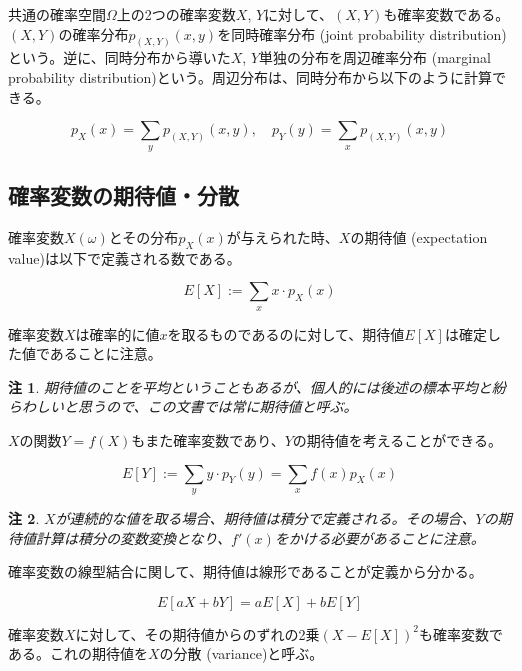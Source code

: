 \documentclass[uplatex,dvipdfmx]{jlreq}
\newcommand\term[1]{\textsf{#1}}
\newtheorem{note}{注}
\begin{document}
共通の確率空間$\Omega$上の2つの確率変数$X$, $Y$に対して、$(X, Y)$も確率変数である。$(X, Y)$の確率分布$p_{(X, Y)}(x, y)$を\term{同時確率分布 (joint probability distribution)}という。逆に、同時分布から導いた$X$, $Y$単独の分布を\term{周辺確率分布 (marginal probability distribution)}という。周辺分布は、同時分布から以下のように計算できる。

\begin{equation}
    p_X(x) = \sum_y p_{(X, Y)}(x, y),\quad
    p_Y(y) = \sum_x p_{(X, Y)}(x, y)
\end{equation}

\subsection{確率変数の期待値・分散}

確率変数$X(\omega)$とその分布$p_X(x)$が与えられた時、$X$の\term{期待値 (expectation value)}は以下で定義される数である。

\begin{equation}
    E[X] := \sum_x x \cdot p_X(x)
\end{equation}

確率変数$X$は確率的に値$x$を取るものであるのに対して、期待値$E[X]$は確定した値であることに注意。

\begin{note}
    期待値のことを平均ということもあるが、個人的には後述の標本平均と紛らわしいと思うので、この文書では常に期待値と呼ぶ。
\end{note}

$X$の関数$Y=f(X)$もまた確率変数であり、$Y$の期待値を考えることができる。

\begin{equation}
    E[Y] := \sum_y y \cdot p_Y(y) = \sum_x f(x)p_X(x)
\end{equation}

\begin{note}
    $X$が連続的な値を取る場合、期待値は積分で定義される。その場合、$Y$の期待値計算は積分の変数変換となり、$f'(x)$をかける必要があることに注意。
\end{note}

確率変数の線型結合に関して、期待値は線形であることが定義から分かる。

\begin{equation}
    E[aX + bY] = aE[X] + bE[Y]
\end{equation}

確率変数$X$に対して、その期待値からのずれの2乗$(X-E[X])^2$も確率変数である。これの期待値を$X$の\term{分散 (variance)}と呼ぶ。
\end{document}
